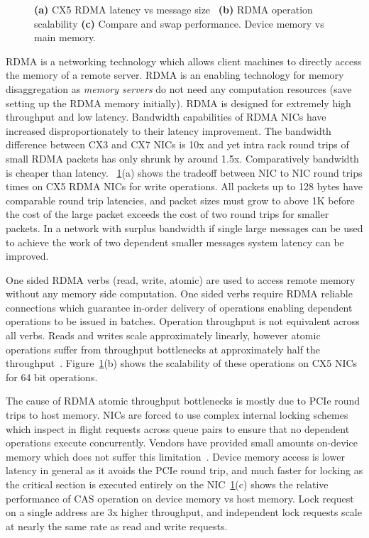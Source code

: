 \begin{figure}[t]
\begin{subfigure}{0.3\linewidth}
    \end{subfigure}
    \vspace{-1em}
    \caption{
    \textbf{(a)} CX5 RDMA latency vs message size~\cite{rdma-latency}
    \textbf{(b)} RDMA operation scalability
    \textbf{(c)} Compare and swap performance. Device memory vs main memory.
    }
    \label{fig:rdma-benchmarks}
\end{figure}

RDMA is a networking technology which allows client machines
to directly access the memory of a remote server. RDMA is an
enabling technology for memory disaggregation as
\textit{memory servers} do not need any computation
resources (save setting up the RDMA memory initially). RDMA
is designed for extremely high throughput and low latency.
Bandwidth capabilities of RDMA NICs have increased
disproportionately to their latency improvement. The
bandwidth difference between CX3 and CX7 NICs is 10x and yet
intra rack round trips of small RDMA packets has only shrunk
by around 1.5x. Comparatively bandwidth is cheaper than
latency. ~\ref{fig:rdma-benchmarks}(a) shows the tradeoff
between NIC to NIC round trips times on CX5 RDMA NICs for
write operations. All packets up to 128 bytes have
comparable round trip latencies, and packet sizes must grow
to above 1K before the cost of the large packet exceeds the
cost of two round trips for smaller packets. In a network
with surplus bandwidth if single large messages can be used
to achieve the work of two dependent smaller messages system
latency can be improved.

One sided RDMA verbs (read, write, atomic) are used to
access remote memory without any memory side computation.
One sided verbs require RDMA reliable connections which
guarantee in-order delivery of operations enabling dependent
operations to be issued in batches. Operation throughput is
not equivalent across all verbs. Reads and writes scale
approximately linearly, however atomic operations suffer
from throughput bottlenecks at approximately half the
throughput~\cite{design-guidelines,sherman}.
Figure~\ref{fig:rdma-benchmarks}(b) shows the scalability of
these operations on CX5 NICs for 64 bit operations.

The cause of RDMA atomic throughput bottlenecks is mostly
due to PCIe round trips to host memory. NICs are forced to
use complex internal locking schemes which inspect in flight
requests across queue pairs to ensure that no dependent
operations execute concurrently. Vendors have provided small
amounts on-device memory which does not suffer this
limitation~\cite{device-memory}. Device memory access is
lower latency in general as it avoids the PCIe round trip,
and much faster for locking as the critical section is
executed entirely on the NIC~\ref{fig:rdma-benchmarks}(c)
shows the relative performance of CAS operation on device
memory vs host memory. Lock request on a single address are
3x higher throughput, and independent lock requests scale at
nearly the same rate as read and write requests.

